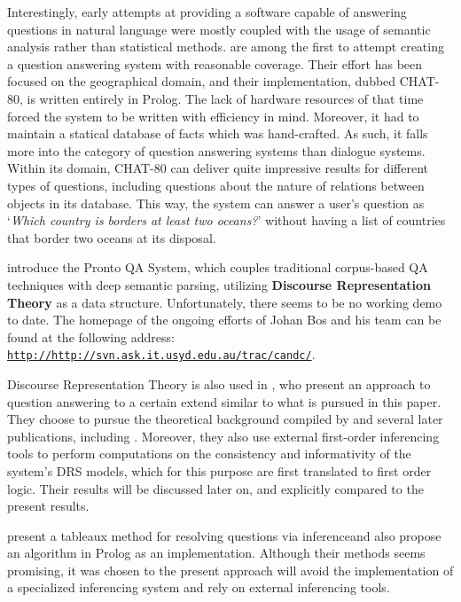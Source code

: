 \documentclass[a4paper]{article}
\newcommand{\abbr}{\textsf} %
\newcommand{\term}[1]{\textsf{\textbf{#1}}} %
\newcommand{\code}[1]{\texttt{#1}} %
\newcommand{\pn}{\textsf} %
\newcommand{\url}[1]{\code{http://#1}} %
\newcommand{\example}[1]{`\textit{#1}'} %
\newcommand{\prol}{\pn{Prolog}}
\theoremstyle{remark}
\theoremstyle{remark}
\theoremstyle{definition}
\theoremstyle{definition}
\begin{document}
Interestingly, early attempts at providing a software capable of answering
questions in natural language were mostly coupled with the usage of semantic
analysis rather than statistical methods.  \cite{chat} are among  the first to
attempt creating a question answering system with reasonable coverage. Their
effort has been focused on the geographical domain, and their implementation,
dubbed \pn{CHAT-80}, is written entirely in \prol. The lack of hardware
resources of that time forced the system to be written with efficiency in mind.
Moreover, it had to maintain a statical database of facts which was
hand-crafted. As such, it falls more into the category of question answering
systems than dialogue systems. Within its domain, \pn{CHAT-80} can deliver quite
impressive results for different types of questions, including questions about
the nature of relations between objects in its database.  This way, the system
can answer a user's question as \example{Which country is borders at least two
oceans?} without having a list of countries that border two oceans at its
disposal.

\cite{prontoqa} introduce the \pn{Pronto QA System}, which couples traditional
corpus-based \abbr{QA} techniques with deep semantic parsing, utilizing
\term{Discourse Representation Theory} as a data structure. Unfortunately, there
seems to be no working demo to date. The homepage of the ongoing efforts of
Johan Bos and his team can be found at the following address:
\href{http://svn.ask.it.usyd.edu.au/trac/candc/}{\url{http://svn.ask.it.usyd.edu.au/trac/candc/}}.

Discourse Representation Theory is also used in \cite{bosgabdsil}, who present
an approach to question answering to a certain extend similar to what is pursued
in this paper. They choose to pursue the theoretical background compiled by
\cite{gs:sqpa} and several later publications, including \cite{gs:q}. Moreover,
they also use external first-order inferencing tools to perform computations on
the consistency and informativity of the system's DRS models, which for this
purpose are first translated to first order logic.  Their results will be
discussed later on, and explicitly compared to the present results.

\cite{tenCate} present a tableaux method for resolving questions via inferenceand also
propose an algorithm in \prol{} as an implementation. Although their methods
seems promising, it was chosen to
the present approach will avoid the implementation of a specialized inferencing
system and rely on external inferencing tools.
\end{document}

